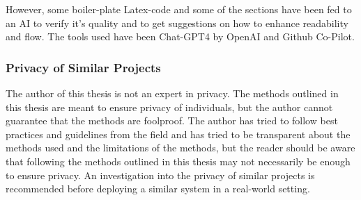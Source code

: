 However, some boiler-plate Latex-code and some of the sections have been fed to an AI to verify it's quality and to get suggestions on how to enhance readability and flow. The tools used have been Chat-GPT4 by OpenAI and Github Co-Pilot.  

\subsubsection{Privacy of Similar Projects}
The author of this thesis is not an expert in privacy. The methods outlined in this thesis are meant to ensure privacy of individuals, but the author cannot guarantee that the methods are foolproof. The author has tried to follow best practices and guidelines from the field and has tried to be transparent about the methods used and the limitations of the methods, but the reader should be aware that following the methods outlined in this thesis may not necessarily be enough to ensure privacy. An investigation into the privacy of similar projects is recommended before deploying a similar system in a real-world setting.